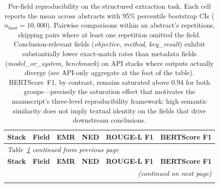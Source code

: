 {\scriptsize
\setlength{\tabcolsep}{4pt}
\setlength{\LTleft}{0pt}
\setlength{\LTright}{0pt}
\begin{longtable}{@{}p{3.2cm}lcccc@{}}
\caption{Per-field reproducibility on the structured extraction task. Each cell reports the mean across abstracts with 95\% percentile bootstrap CIs ($n_{\text{boot}}{=}10{,}000$). Pairwise comparisons within an abstract's repetitions, skipping pairs where at least one repetition omitted the field. Conclusion-relevant fields (\emph{objective}, \emph{method}, \emph{key\_result}) exhibit substantially lower exact-match rates than metadata fields (\emph{model\_or\_system}, \emph{benchmark}) on API stacks where outputs actually diverge (see API-only aggregate at the foot of the table). BERTScore~F1, by contrast, remains saturated above 0.94 for both groups---precisely the saturation effect that motivates the manuscript's three-level reproducibility framework: high semantic similarity does not imply textual identity on the fields that drive downstream conclusions.}\label{tab:per_field_metrics}\\
\toprule
\textbf{Stack} & \textbf{Field} & \textbf{EMR} & \textbf{NED} & \textbf{ROUGE-L F1} & \textbf{BERTScore F1} \\
\midrule
\endfirsthead

\multicolumn{6}{l}{\textit{Table~\ref{tab:per_field_metrics} continued from previous page}}\\
\toprule
\textbf{Stack} & \textbf{Field} & \textbf{EMR} & \textbf{NED} & \textbf{ROUGE-L F1} & \textbf{BERTScore F1} \\
\midrule
\endhead

\midrule
\multicolumn{6}{r}{\textit{(continued on next page)}}\\
\endfoot

\bottomrule
\endlastfoot


\end{longtable}}
